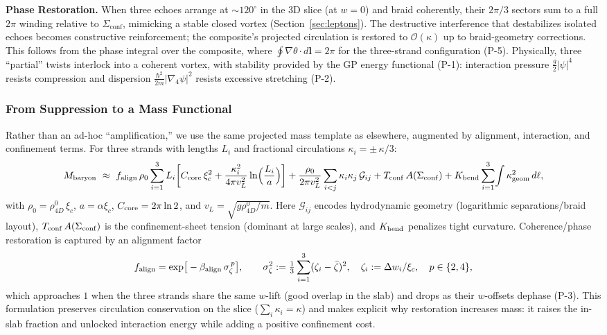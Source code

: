\textbf{Phase Restoration.} When three echoes arrange at $\sim120^\circ$ in the 3D slice (at $w=0$) and braid coherently, their $2\pi/3$ sectors sum to a full $2\pi$ winding relative to $\Sigma_{\mathrm{conf}}$, mimicking a stable closed vortex (Section~\ref{sec:leptons}). The destructive interference that destabilizes isolated echoes becomes constructive reinforcement; the composite’s projected circulation is restored to $\mathcal{O}(\kappa)$ up to braid-geometry corrections. This follows from the phase integral over the composite, where $\oint \nabla \theta \cdot d\mathbf{l}=2\pi$ for the three-strand configuration (P-5). Physically, three ``partial'' twists interlock into a coherent vortex, with stability provided by the GP energy functional (P-1): interaction pressure $\tfrac{g}{2}|\psi|^4$ resists compression and dispersion $\tfrac{\hbar^2}{2m}|\nabla_4\psi|^2$ resists excessive stretching (P-2).

\subsubsection{From Suppression to a Mass Functional}

Rather than an ad-hoc ``amplification,'' we use the same projected mass template as elsewhere, augmented by alignment, interaction, and confinement terms. For three strands with lengths $L_i$ and fractional circulations $\kappa_i=\pm\,\kappa/3$:
\begin{equation}
\label{eq:baryon-mass-functional}
M_{\rm baryon}\ \approx\
f_{\rm align}\,\rho_0\sum_{i=1}^{3} L_i\!\left[C_{\rm core}\,\xi_c^2+\frac{\kappa_i^{2}}{4\pi v_L^{2}}\ln\!\Big(\frac{L_i}{a}\Big)\right]
+\frac{\rho_0}{2\pi v_L^{2}}\sum_{i<j}\kappa_i\kappa_j\,\mathcal{G}_{ij}
+T_{\rm conf}\,A(\Sigma_{\rm conf})
+K_{\rm bend}\sum_{i=1}^{3}\!\int \kappa_{\rm geom}^2\,d\ell,
\end{equation}
with $\rho_0=\rho_{4D}^0\,\xi_c$, $a=\alpha\xi_c$, $C_{\rm core}=2\pi\ln 2$, and $v_L=\sqrt{g\rho_{4D}^0/m}$. Here $\mathcal{G}_{ij}$ encodes hydrodynamic geometry (logarithmic separations/braid layout), $T_{\rm conf}\,A(\Sigma_{\rm conf})$ is the confinement-sheet tension (dominant at large scales), and $K_{\rm bend}$ penalizes tight curvature. Coherence/phase restoration is captured by an alignment factor
\[
f_{\rm align}=\exp\!\big[-\beta_{\rm align}\,\sigma_\zeta^{\,p}\big],\qquad
\sigma_\zeta^2 := \tfrac{1}{3}\sum_{i=1}^{3} (\zeta_i-\bar\zeta)^2,\quad \zeta_i:=\Delta w_i/\xi_c,\quad p\in\{2,4\},
\]
which approaches $1$ when the three strands share the same $w$-lift (good overlap in the slab) and drops as their $w$-offsets dephase (P-3). This formulation preserves circulation conservation on the slice ($\sum_i\kappa_i=\kappa$) and makes explicit why restoration increases mass: it raises the in-slab fraction and unlocked interaction energy while adding a positive confinement cost.

